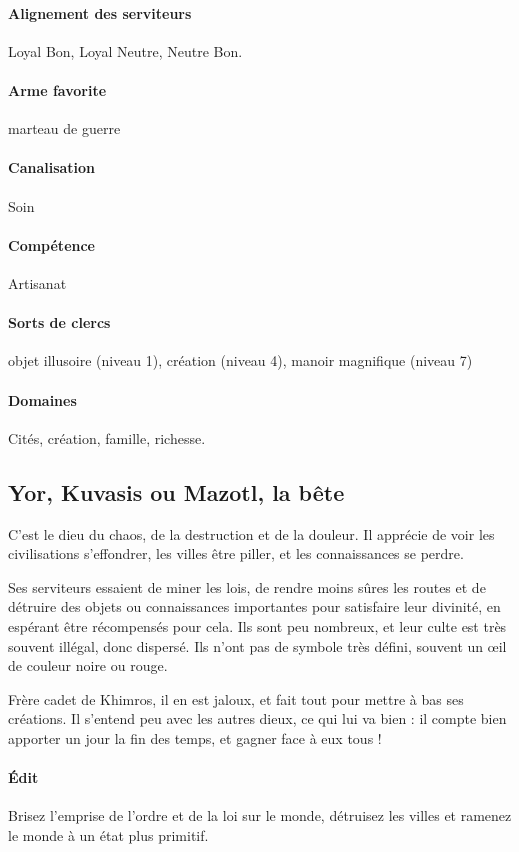 \documentclass[10pt,a4paper]{book}
\begin{document}
\paragraph{Alignement des serviteurs} Loyal Bon, Loyal Neutre, Neutre Bon.
\paragraph{Arme favorite } marteau de guerre
\paragraph{Canalisation} Soin
\paragraph{Compétence} Artisanat
\paragraph{Sorts de clercs} objet illusoire (niveau 1), création (niveau 4), manoir magnifique (niveau 7)
\paragraph{Domaines }Cités, création, famille, richesse.
\subsection{Yor, Kuvasis ou Mazotl, la bête}
C'est le dieu du chaos, de la destruction et de la douleur. Il apprécie de voir les civilisations s'effondrer, les villes être piller, et les connaissances se perdre. 

Ses serviteurs essaient de miner les lois, de rendre moins sûres les routes et de détruire des objets ou connaissances importantes pour satisfaire leur divinité, en espérant être récompensés pour cela. Ils sont peu nombreux, et leur culte est très souvent illégal, donc dispersé. Ils n'ont pas de symbole très défini, souvent un œil de couleur noire ou rouge.

Frère cadet de Khimros, il en est jaloux, et fait tout pour mettre à bas ses créations. Il s'entend peu avec les autres dieux, ce qui lui va bien : il compte bien apporter un jour la fin des temps, et gagner face à eux tous !
\paragraph{Édit}Brisez l'emprise de l'ordre et de la loi sur le monde, détruisez les villes et ramenez le monde à un état plus primitif.
\end{document}
